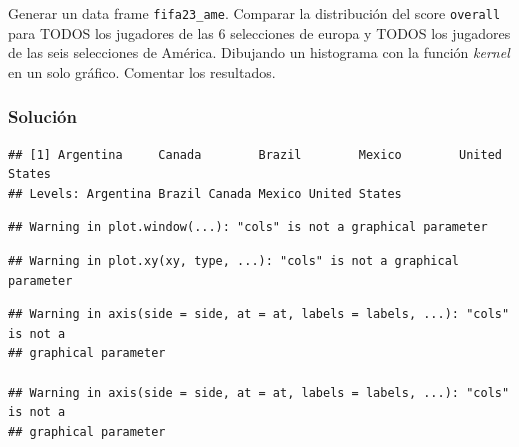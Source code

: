\documentclass[
]{article}
\newenvironment{Shaded}{\begin{snugshade}}{\end{snugshade}}
\newcommand{\AttributeTok}[1]{\textcolor[rgb]{0.77,0.63,0.00}{#1}}
\newcommand{\FunctionTok}[1]{\textcolor[rgb]{0.00,0.00,0.00}{#1}}
\newcommand{\NormalTok}[1]{#1}
\newcommand{\OtherTok}[1]{\textcolor[rgb]{0.56,0.35,0.01}{#1}}
\newcommand{\SpecialCharTok}[1]{\textcolor[rgb]{0.00,0.00,0.00}{#1}}
\newcommand{\StringTok}[1]{\textcolor[rgb]{0.31,0.60,0.02}{#1}}
\begin{document}
Generar un data frame \texttt{fifa23\_ame}. Comparar la distribución del
score \texttt{overall} para TODOS los jugadores de las 6 selecciones de
europa y TODOS los jugadores de las seis selecciones de América.
Dibujando un histograma con la función \emph{kernel} en un solo gráfico.
Comentar los resultados.

\hypertarget{soluciuxf3n}{%
\subsubsection{Solución}\label{soluciuxf3n}}

\begin{Shaded}
\end{Shaded}

\begin{verbatim}
## [1] Argentina     Canada        Brazil        Mexico        United States
## Levels: Argentina Brazil Canada Mexico United States
\end{verbatim}

\begin{Shaded}
\end{Shaded}

\begin{verbatim}
## Warning in plot.window(...): "cols" is not a graphical parameter
\end{verbatim}

\begin{verbatim}
## Warning in plot.xy(xy, type, ...): "cols" is not a graphical parameter
\end{verbatim}

\begin{verbatim}
## Warning in axis(side = side, at = at, labels = labels, ...): "cols" is not a
## graphical parameter

## Warning in axis(side = side, at = at, labels = labels, ...): "cols" is not a
## graphical parameter
\end{verbatim}
\end{document}
